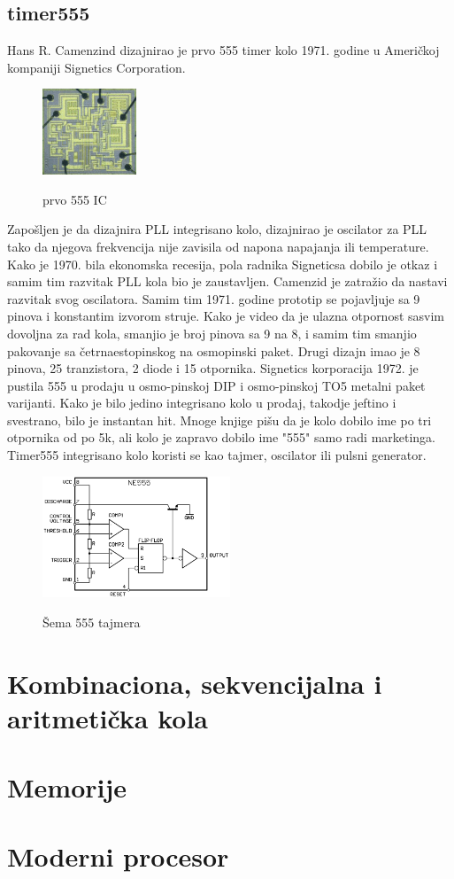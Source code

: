 \documentclass[12pt,a4paper]{article}
\begin{document}
\subsection{timer555}
Hans R. Camenzind dizajnirao je prvo 555 timer kolo 1971. godine u Američkoj kompaniji Signetics Corporation.
\begin{figure}
  \begin{center}
    \includegraphics[width=0.25\textwidth]{555si}
  \end{center}
  \caption{prvo 555 IC}\cite{555W}
\end{figure}
Zapošljen je da dizajnira PLL integrisano kolo, dizajnirao je oscilator za PLL tako da njegova frekvencija nije zavisila od napona napajanja ili temperature. 
Kako je 1970. bila ekonomska recesija, pola radnika Signeticsa dobilo je otkaz i samim tim razvitak PLL kola bio je zaustavljen. 
Camenzid je zatražio da nastavi razvitak svog oscilatora. Samim tim 1971. godine prototip se pojavljuje sa 9 pinova i konstantim izvorom struje. 
Kako je video da je ulazna otpornost sasvim dovoljna za rad kola, smanjio je broj pinova sa 9 na 8, i samim tim smanjio pakovanje sa četrnaestopinskog na osmopinski paket.\cite{555W}
Drugi dizajn imao je 8 pinova, 25 tranzistora, 2 diode i 15 otpornika. Signetics korporacija 1972. je pustila 555 u prodaju u osmo-pinskoj DIP i osmo-pinskoj TO5 metalni paket varijanti. Kako je bilo jedino integrisano kolo u prodaj, takodje jeftino i svestrano, bilo je instantan hit.\cite{555H}
Mnoge knjige pišu da je kolo dobilo ime po tri otpornika od po 5k\ohm, ali kolo je zapravo dobilo ime "555" samo radi marketinga. 
Timer555 integrisano kolo koristi se kao tajmer, oscilator ili pulsni generator.
\begin{figure}[h]
  \centering
  \includegraphics[width=0.5\textwidth]{555}
  \caption{Šema 555 tajmera}\cite{555W}
\end{figure}
\newpage
\section{Kombinaciona, sekvencijalna i aritmetička kola}
\newpage
\section{Memorije}
\newpage
\section{Moderni procesor}
\newpage

\printbibliography[title={Reference}]
\end{document}
